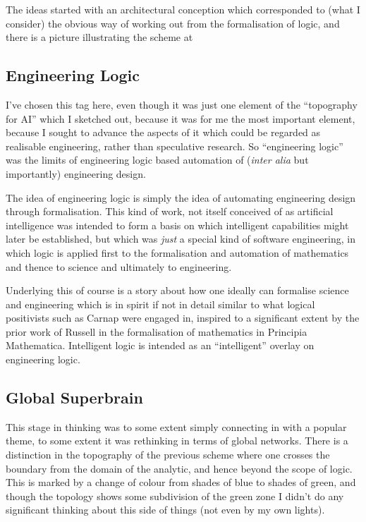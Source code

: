 \documentclass[10pt,titlepage]{book}
\begin{document}
The ideas started with an architectural conception which corresponded to (what I consider) the obvious way of working out from the formalisation of logic, and there is a picture illustrating the scheme at 

\subsection{Engineering Logic}

I've chosen this tag here, even though it was just one element of the ``topography for AI'' which I sketched out, because it was for me the most important element, because I sought to advance the aspects of it which could be regarded as realisable engineering, rather than speculative research.
So ``engineering logic'' was the limits of engineering logic based automation of ({\it inter alia} but importantly) engineering design.

The idea of engineering logic is simply the idea of automating engineering design through formalisation.
This kind of work, not itself conceived of as artificial intelligence was intended to form a basis on which intelligent capabilities might later be established, but which was {\it just} a special kind of software engineering, in which logic is applied first to the formalisation and automation of mathematics and thence to science and ultimately to engineering.

Underlying this of course is a story about how one ideally can formalise science and engineering which is in spirit if not in detail similar to what logical positivists such as Carnap were engaged in, inspired to a significant extent by the prior work of Russell in the formalisation of mathematics in Principia Mathematica.
Intelligent logic is intended as an ``intelligent'' overlay on engineering logic.

\subsection{Global Superbrain}

This stage in thinking was to some extent simply connecting in with a popular theme, to some extent it was rethinking in terms of global networks.
There is a distinction in the topography of the previous scheme where one crosses the boundary from the domain of the analytic, and hence beyond the scope of logic.
This is marked by a change of colour from shades of blue to shades of green, and though the topology shows some subdivision of the green zone I didn't do any significant thinking about this side of things (not even by my own lights).
\end{document}

